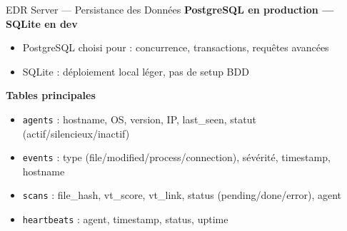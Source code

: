 \documentclass[xcolor=dvipsnames, aspectratio=169, 10pt]{beamer}
\newcommand{\bitem}{\item[$\bullet$]}
\begin{document}
\begin{frame}{EDR Server — Persistance des Données}
  \textbf{PostgreSQL en production — SQLite en dev}
  \begin{itemize}
    \bitem PostgreSQL choisi pour : concurrence, transactions, requêtes avancées
    \bitem SQLite : déploiement local léger, pas de setup BDD
  \end{itemize}
  \vspace{0.3cm}
  \textbf{Tables principales}
  \begin{itemize}
    \bitem \texttt{agents} : hostname, OS, version, IP, last\_seen, statut (actif/silencieux/inactif)
    \bitem \texttt{events} : type (file/modified/process/connection), sévérité, timestamp, hostname
    \bitem \texttt{scans} : file\_hash, vt\_score, vt\_link, status (pending/done/error), agent
    \bitem \texttt{heartbeats} : agent, timestamp, status, uptime
  \end{itemize}
\end{frame}
\end{document}
